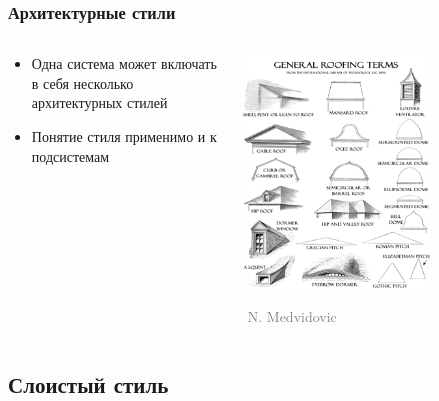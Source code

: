 \documentclass[xetex,mathserif,serif]{beamer}
\newcommand{\attribution}[1] {
    \vspace{-5mm}\begin{flushright}\begin{scriptsize}\textcolor{gray}{\textcopyright\, #1}\end{scriptsize}\end{flushright}
}
\begin{document}
    \begin{frame}
        \frametitle{Архитектурные стили}
        \begin{columns}
            \begin{column}{0.5\textwidth}
                \begin{itemize}
                    \item Одна система может включать в себя несколько архитектурных стилей
                    \item Понятие стиля применимо и к подсистемам
                \end{itemize}
            \end{column}
            \begin{column}{0.5\textwidth}
                \begin{center}
                    \includegraphics[width=0.7\textwidth]{roofStyles.png}
                    \attribution{N. Medvidovic}
                \end{center}
            \end{column}
        \end{columns}
    \end{frame}

    \subsection{Слоистый стиль}
\end{document}
